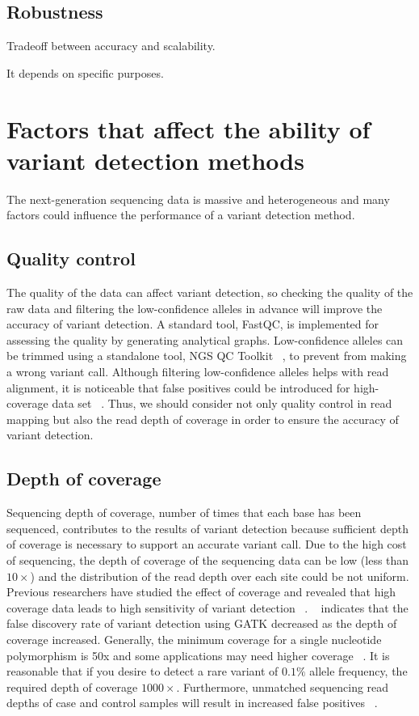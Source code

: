 \documentclass[11pt,reqno]{amsart}
\begin{document}
\subsection{Robustness}

Tradeoff between accuracy and scalability.

It depends on specific purposes.

\section{Factors that affect the ability of variant detection methods}
The next-generation sequencing data is massive and heterogeneous and many factors could influence the performance of a variant detection method.
\subsection{Quality control}
The quality of the data can affect variant detection, so checking the quality of the raw data and filtering the low-confidence alleles in advance will improve the accuracy of variant detection.
A standard tool, FastQC, is implemented for assessing the quality by generating analytical graphs.
Low-confidence alleles can be trimmed using a standalone tool, NGS QC Toolkit ~\citep{patel2012ngs}, to prevent from making a wrong variant call.
Although filtering low-confidence alleles helps with read alignment, it is noticeable that false positives could be introduced for high-coverage data set ~\citep{liu2012steps}.
Thus, we should consider not only quality control in read mapping but also the read depth of coverage in order to ensure the accuracy of variant detection.

\subsection{Depth of coverage}
Sequencing depth of coverage, number of times that each base has been sequenced, contributes to the results of variant detection because sufficient depth of coverage is necessary to support an accurate variant call.
Due to the high cost of sequencing, the depth of coverage of the sequencing data can be low (less than $10\times$) and the distribution of the read depth over each site could be not uniform.
Previous researchers have studied the effect of coverage and revealed that high coverage data leads to high sensitivity of variant detection ~\citep{neuman2013analysis, krawitz2010microindel}.
~\citep{liu2013variant} indicates that the false discovery rate of variant detection using GATK decreased as the depth of coverage increased.
Generally, the minimum coverage for a single nucleotide polymorphism is 50x and some applications may need higher coverage ~\citep{Schlotterer2014}.
It is reasonable that if you desire to detect a rare variant of $0.1 \%$ allele frequency, the required depth of coverage $1000\times$.
Furthermore, unmatched sequencing read depths of case and control samples will result in increased false positives ~\citep{garner2011confounded}.
\end{document}
